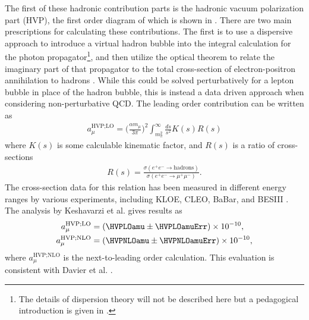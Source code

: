 The first of these hadronic contribution parts is the hadronic vacuum polarization part (HVP), the first order diagram of which is shown in . There are two main prescriptions for calculating these contributions. The first is to use a dispersive approach to introduce a virtual hadron bubble into the integral calculation for the photon propagator\footnote{The details of dispersion theory will not be described here but a pedagogical introduction is given in .}, and then utilize the optical theorem to relate the imaginary part of that propagator to the total cross-section of electron-positron annihilation to hadrons \cite{Jeger}. While this could be solved perturbatively for a lepton bubble in place of the hadron bubble, this is instead a data driven approach when considering non-perturbative QCD. The leading order contribution can be written as 
		\begin{align}
            a_{\mu}^{\text{HVP;LO}} = \Big(\frac{\alpha m_{\mu}}{3\pi}\Big)^{2} \int_{m_{\pi}^{2}}^{\infty} \frac{ds}{s^{2}} K(s) R(s)
		\end{align}
where $K(s)$ is some calculable kinematic factor, and $R(s)$ is a ratio of cross-sections
		\begin{align}
            R(s) = \frac{\sigma(e^{+}e^{-} \rightarrow \text{hadrons})}{\sigma(e^{+}e^{-} \rightarrow \mu^{+}\mu^{-})}.
		\end{align}
The cross-section data for this relation has been measured in different energy ranges by various experiments, including KLOE, CLEO, BaBar, and BESIII \cite{KLOE,CLEO,BaBar,BESIII}. The analysis by Keshavarzi et al. \cite{Keshavarzi:2018mgv} gives results as 
		\begin{equation}
		\begin{aligned}
            a_{\mu}^{\text{HVP;LO}} &= (\HVPLOamu \pm \HVPLOamuErr) \times 10^{-10}, \\
            a_{\mu}^{\text{HVP;NLO}} &= (\HVPNLOamu \pm \HVPNLOamuErr) \times 10^{-10}, 
		\end{aligned}
		\end{equation}
where $a_{\mu}^{\text{HVP;NLO}}$ is the next-to-leading order calculation. This evaluation is consistent with Davier et al. \cite{HVP2}.

